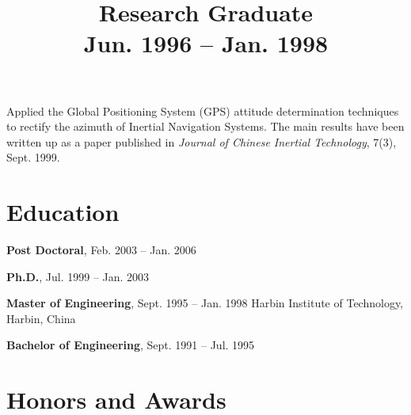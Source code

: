 \documentclass[line,10pt,final]{res}
\begin{document}
\begin{resume}
{\title{\bf Research Graduate \\ \bf Jun. 1996 -- Jan. 1998}
 \location{}
\dates{}
\begin{position}
Applied the Global Positioning System (GPS) attitude determination
techniques to rectify the azimuth of Inertial Navigation Systems.
The main results have been written up as a paper published in {\em
Journal of Chinese Inertial Technology}, 7(3), Sept. 1999.
\end{position}

}


\section{\sc Education}


{\bf Post Doctoral}, Feb. 2003 -- Jan. 2006 

{\bf Ph.D.}, Jul. 1999 -- Jan. 2003 

{\bf Master of Engineering}, Sept. 1995 -- Jan. 1998 \newline
{Harbin Institute of Technology, Harbin, China
}

{\bf Bachelor of Engineering}, Sept. 1991 -- Jul. 1995 



\section{\sc Honors and Awards}


\end{resume}
\end{document}
